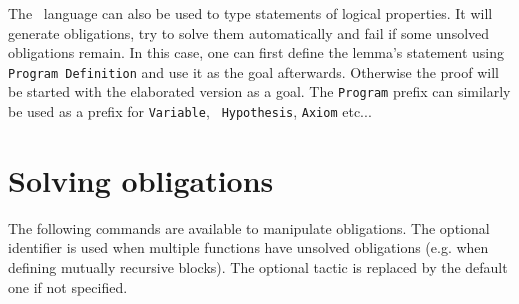 The \Russell\ language can also be used to type statements of logical
properties. It will generate obligations, try to solve them
automatically and fail if some unsolved obligations remain. 
In this case, one can first define the lemma's
statement using {\tt Program Definition} and use it as the goal afterwards.
Otherwise the proof will be started with the elaborated version as a goal.
The {\tt Program} prefix can similarly be used as a prefix for {\tt Variable}, {\tt
  Hypothesis}, {\tt Axiom} etc...

\section{Solving obligations}
The following commands are available to manipulate obligations. The
optional identifier is used when multiple functions have unsolved
obligations (e.g. when defining mutually recursive blocks). The optional
tactic is replaced by the default one if not specified.

